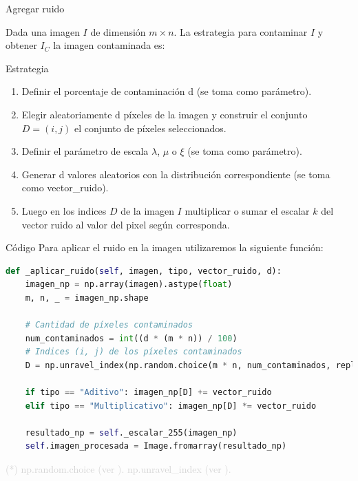 \documentclass{beamer}
\begin{document}
\begin{frame}[fragile]{Agregar ruido}
	\justifying
	
	Dada una imagen $I$ de dimensión $m \times n$. La estrategia para contaminar $I$ y obtener $I_C$ la imagen contaminada es:
	
	\begin{block}{Estrategia}
		\begin{enumerate}
			\item Definir el porcentaje de contaminación d (se toma como parámetro).
			\item Elegir aleatoriamente d píxeles de la imagen y construir el conjunto $D = (i,j)$ el conjunto de píxeles seleccionados.
			\item Definir el parámetro de escala $\lambda$, $\mu$ o $\xi$ (se toma como parámetro).
			\item Generar d valores aleatorios con la distribución correspondiente (se toma como vector\_ruido).
			\item Luego en los indices $D$ de la imagen $I$ multiplicar o sumar el escalar  $k$ del vector ruido al valor del pixel según corresponda.
		\end{enumerate}
	\end{block}
\end{frame}


\begin{frame}[fragile]{Código}
	\justifying
	Para aplicar el ruido en la imagen utilizaremos la siguiente función:
	
	\begin{lstlisting}[language=Python]
def _aplicar_ruido(self, imagen, tipo, vector_ruido, d):
	imagen_np = np.array(imagen).astype(float)
	m, n, _ = imagen_np.shape
	
	# Cantidad de píxeles contaminados
	num_contaminados = int((d * (m * n)) / 100)
	# Indices (i, j) de los píxeles contaminados
	D = np.unravel_index(np.random.choice(m * n, num_contaminados, replace=False),(m, n))
	
	if tipo == "Aditivo": imagen_np[D] += vector_ruido
	elif tipo == "Multiplicativo": imagen_np[D] *= vector_ruido
	
	resultado_np = self._escalar_255(imagen_np)
	self.imagen_procesada = Image.fromarray(resultado_np)
	\end{lstlisting}
	
	\vfill
	\footnotesize \textcolor{lightgray}{(*) np.random.choice (ver \cite{numpy-random.choice}). np.unravel\_index (ver \cite{numpy-unravel-index}).}
\end{frame}
\end{document}
